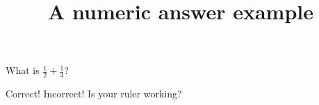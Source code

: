 \documentclass[hidesidemenu]{webquiz}
\title{A numeric answer example}
\begin{document}
  \begin{question}     %
      What is $\frac12+\frac14$?

     \whenRight Correct!
     \whenWrong Incorrect! Is your ruler working?
  \end{question}
\end{document}
